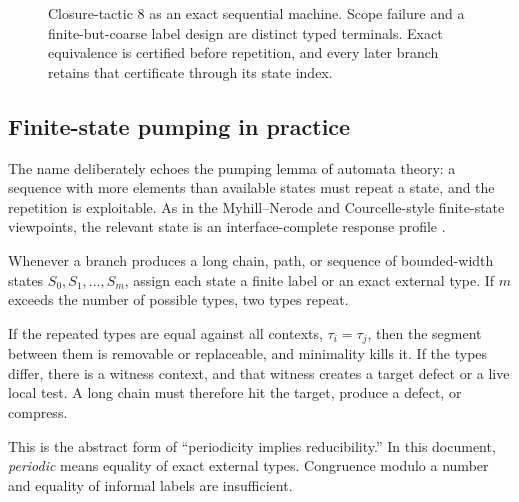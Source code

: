 \documentclass[
  11pt,
]{article}
\theoremstyle{definition}
\begin{document}
\begin{figure}[p]
{%
}
\caption[Closure-tactic 8: exact finite-state machine]{Closure-tactic 8 as an exact sequential machine.  Scope failure and a finite-but-coarse label design are distinct typed terminals.  Exact equivalence is certified before repetition, and every later branch retains that certificate through its state index.}
\label{fig:ct8-finite-state-pumping}
\end{figure}
\FloatBarrier


\subsection*{Finite-state pumping in practice}

The name deliberately echoes the pumping lemma of automata theory: a
sequence with more elements than available states must repeat a state,
and the repetition is exploitable. As in the Myhill--Nerode and
Courcelle-style finite-state viewpoints, the relevant state is an
interface-complete response profile
\citep{myhill-1957-automata, nerode-1958-linear, courcelle-1990-mso-graphs, courcelle-engelfriet-2012-graph-structure}.

Whenever a branch produces a long chain, path, or sequence of
bounded-width states \(S_0, S_1, \ldots, S_m\), assign each state a
finite label or an exact external type. If \(m\) exceeds the number of
possible types, two types repeat.

If the repeated types are equal against all contexts,
\(\tau_i = \tau_j\), then the segment between them is removable or
replaceable, and minimality kills it. If the types differ, there is a
witness context, and that witness creates a target defect or a live
local test. A long chain must therefore hit the target, produce a
defect, or compress.

This is the abstract form of ``periodicity implies reducibility.'' In
this document, \emph{periodic} means equality of exact external types.
Congruence modulo a number and equality of informal labels are
insufficient.
\end{document}

